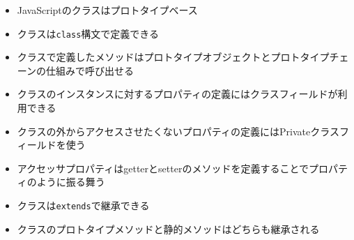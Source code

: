 \begin{itemize}
\item
  JavaScriptのクラスはプロトタイプベース
\item
  クラスは\texttt{class}構文で定義できる
\item
  クラスで定義したメソッドはプロトタイプオブジェクトとプロトタイプチェーンの仕組みで呼び出せる
\item
  クラスのインスタンスに対するプロパティの定義にはクラスフィールドが利用できる
\item
 クラスの外からアクセスさせたくないプロパティの定義にはPrivateクラスフィールドを使う
\item
  アクセッサプロパティはgetterとsetterのメソッドを定義することでプロパティのように振る舞う
\item
  クラスは\texttt{extends}で継承できる
\item
  クラスのプロトタイプメソッドと静的メソッドはどちらも継承される
\end{itemize}
